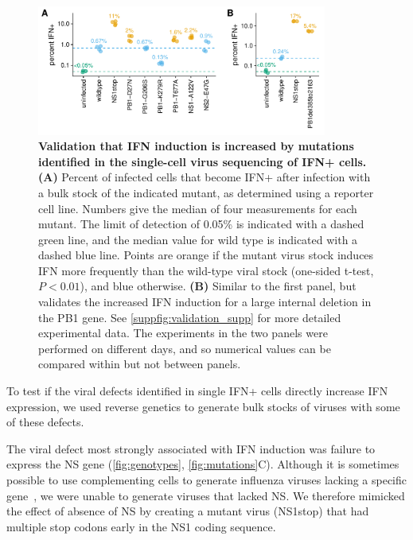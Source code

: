 \documentclass[10pt,letterpaper]{article}
\newcommand{\FIG}[1]{\autoref{fig:#1}}
\newcommand{\SUPPFIG}[1]{\autoref{suppfig:#1}}
\begin{document}
\begin{figure}[b!]

\centerline{\includegraphics[width=0.85\textwidth]{figures/Validation_Figure/ifn_plot.pdf}}
\caption{
{\bf Validation that IFN induction is increased by mutations identified in the single-cell virus sequencing of IFN+ cells.}
{\bf (A)}
Percent of infected cells that become IFN+ after infection with a bulk stock of the indicated mutant, as determined using a reporter cell line.
Numbers give the median of four measurements for each mutant.
The limit of detection of 0.05\% is indicated with a dashed green line, and the median value for wild type is indicated with a dashed blue line.
Points are orange if the mutant virus stock induces IFN more frequently than the wild-type viral stock (one-sided t-test, $P < 0.01$), and blue otherwise.
{\bf (B)}
Similar to the first panel, but validates the increased IFN induction for a large internal deletion in the PB1 gene.
See \SUPPFIG{validation_supp} for more detailed experimental data.
The experiments in the two panels were performed on different days, and so numerical values can be compared within but not between panels.
}
\label{fig:validation}

\end{figure}

To test if the viral defects identified in single IFN+ cells directly increase IFN expression, we used reverse genetics to generate bulk stocks of viruses with some of these defects.

The viral defect most strongly associated with IFN induction was failure to express the NS gene (\FIG{genotypes}, \FIG{mutations}C).
Although it is sometimes possible to use complementing cells to generate influenza viruses lacking a specific gene~\citep{fujii2003selective,marsh2007specific}, we were unable to generate viruses that lacked NS.
We therefore mimicked the effect of absence of NS by creating a mutant virus (NS1stop) that had multiple stop codons early in the NS1 coding sequence.
\end{document}
